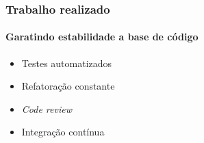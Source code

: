 \documentclass[aspectratio=169]{beamer}
\begin{document}
\begin{frame}
	\frametitle{Trabalho realizado}
	\framesubtitle{Garatindo estabilidade a base de código}
	
	\begin{itemize}
		
		\item Testes automatizados
		
		\item Refatoração constante
		
		\item \textit{Code review}
	
		\item Integração contínua
		
	\end{itemize}
	
\end{frame}
\end{document}
